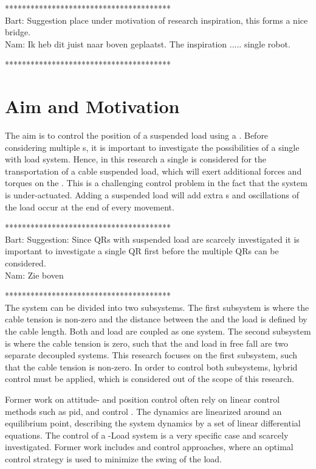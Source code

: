 ***************************************\\
Bart: Suggestion place under motivation of research inspiration, this forms a nice bridge.\\
Nam: Ik heb dit juist naar boven geplaatst. The inspiration ..... single robot. 

***************************************\\
\newpage
\section{Aim and Motivation}\label{sec:int.motivation}
The aim is to control the position of a suspended load using a . Before considering multiple s, it is important to investigate the possibilities of a single  with load system. Hence, in this research a single  is considered for the transportation of a cable suspended load, which will exert additional forces and torques on the . This is a challenging control problem in the fact that the  system is under-actuated. Adding a suspended load will add extra s and oscillations of the load occur at the end of every movement. 

***************************************\\
Bart: Suggestion: Since QRs with suspended load are scarcely investigated it is important to investigate a single QR first before the multiple QRs can be considered.\\
Nam: Zie boven

***************************************\\
The system can be divided into two subsystems. The first subsystem is where the cable tension is non-zero and the distance between the  and the load is defined by the cable length. Both  and load are coupled as one system. The second subsystem is where the cable tension is zero, such that the  and load in free fall are two separate decoupled systems. This research focuses on the first subsystem, such that the cable tension is non-zero. In order to control both subsystems, hybrid control must be applied, which is considered out of the scope of this research.

Former work on  attitude- and position control often rely on linear control methods such as \acs{pid}\cite{bibid},  \cite{Bangura2014} and  control \cite{bibid}. The dynamics are linearized around an equilibrium point, describing the system dynamics by a set of linear differential equations. 
The control of a -Load system is a very specific case and scarcely investigated. Former work includes  \cite{PraveenThesis} and \cite{bibid} control approaches, where an optimal control strategy is used to minimize the swing of the load. 

